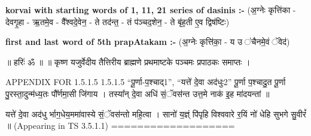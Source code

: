 \documentclass[17pt]{extarticle}
\begin{document}
        \textbf{korvai with starting words of 1, 11, 21 series of dasinis :-} \newline
        (अ॒ग्नेः कृत्ति॑का - देवगृ॒हा - ऋ॒तमे॒व - वै᳚श्वदे॒वेन॒ - ते तद॑न्त॒ - तं प॑ञ्चद॒शेन॒ - ते बृ॑ह॒ती ए॒व द्विष॑ष्टिः) \newline

        \textbf{first and last  word of 5th prapAtakam :-} \newline
        (अ॒ग्नेः कृत्ति॑का॒ - य उ ॑चैनमे॒वं ॅवेद॑) \newline 

       

        ॥ हरिः॑ ॐ ॥
॥ कृष्ण यजुर्वेदीय तैत्तिरीय ब्राह्मणे प्रथमाष्टके पञ्चमः प्रपाठकः समाप्तः ।

APPENDIX FOR 1.5.1.5
1.5.1.5 “पू॒र्णा-प॒श्चाद्{1}”, “यत्ते॑ दे॒वा अद॑धुः{2}” 
पू॒र्णा प॒श्चादु॒त पू॒र्णा पु॒रस्ता॒दुन्म॑ध्य॒तः पौ᳚र्णमा॒सी जि॑गाय । 
तस्या᳚न् दे॒वा अधि॑ सं॒ॅवस॑न्त उत्त॒मे नाक॑ इ॒ह मा॑दयन्तां ॥ 

यत्ते॑ दे॒वा अद॑धु र्भाग॒धेय॒ममा॑वास्ये सं॒ॅवस॑न्तो महि॒त्वा । 
सानो॑ य॒ज्ञ्ं पि॑पृहि विश्ववारे र॒यिं नो॑ धेहि सुभगे सु॒वीरं᳚ ॥
(Appearing in TS 3.5.1.1)
=================== \newline
        \pagebreak
        
        
        
\end{document}
